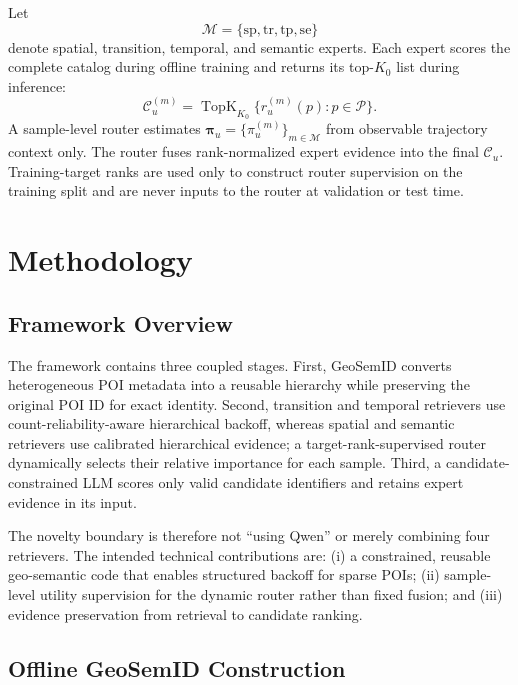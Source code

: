 \documentclass[journal]{IEEEtran}
\newcommand{\Experts}{\mathcal{M}}
\newcommand{\POIs}{\mathcal{P}}
\begin{document}
Let
\begin{equation}
\Experts=\{\mathrm{sp},\mathrm{tr},\mathrm{tp},\mathrm{se}\}
\label{eq:expert_set}
\end{equation}
denote spatial, transition, temporal, and semantic experts.
Each expert scores the complete catalog during offline training and returns
its top-$K_0$ list during inference:
\begin{equation}
\mathcal{C}_{u}^{(m)}
=
\operatorname{TopK}_{K_0}
\{r_{u}^{(m)}(p):p\in\POIs\}.
\label{eq:expert_candidate}
\end{equation}
A sample-level router estimates $\bm{\pi}_u=\{\pi_u^{(m)}\}_{m\in\Experts}$
from observable trajectory context only.
The router fuses rank-normalized expert evidence into the final
$\mathcal{C}_u$.
Training-target ranks are used only to construct router supervision on the
training split and are never inputs to the router at validation or test time.

\section{Methodology}
\label{sec:method}

\subsection{Framework Overview}

The framework contains three coupled stages.
First, GeoSemID converts heterogeneous POI metadata into a reusable hierarchy
while preserving the original POI ID for exact identity.
Second, transition and temporal retrievers use count-reliability-aware
hierarchical backoff, whereas spatial and semantic retrievers use calibrated
hierarchical evidence; a target-rank-supervised router dynamically selects
their relative importance for each sample.
Third, a candidate-constrained LLM scores only valid candidate identifiers and
retains expert evidence in its input.

The novelty boundary is therefore not ``using Qwen'' or merely combining four
retrievers.
The intended technical contributions are:
(i) a constrained, reusable geo-semantic code that enables structured backoff
for sparse POIs;
(ii) sample-level utility supervision for the dynamic router rather than
fixed fusion; and
(iii) evidence preservation from retrieval to candidate ranking.

\subsection{Offline GeoSemID Construction}
\label{subsec:geosemid}
\end{document}
